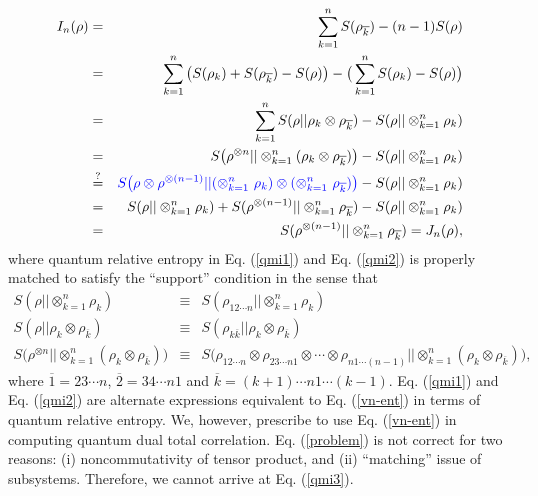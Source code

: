 \documentclass[aps,onecolumn,qic,superscriptaddress,11pt]{revtex4-1}
\begin{document}
\begin{eqnarray}
I_n(\rho) &=& \sum^n_{k=1} S(\rho_{\overline{k}}) - (n-1) S(\rho) \nonumber \\
&=& \sum^n_{k=1} \big(S(\rho_{k}) + S(\rho_{\overline{k}}) - S(\rho) \big) - \big(\sum^n_{k=1} S(\rho_{k}) - S(\rho) \big) \nonumber \\
&=& \sum^n_{k=1} S(\rho || \rho_k \otimes \rho_{\overline{k}}) - S(\rho || \otimes^n_{k=1} \rho_{k}) \label{qmi1} \\
&=& S \big(\rho^{\otimes n} || \otimes^n_{k=1} (\rho_{k} \otimes \rho_{\overline{k}}) \big) - S(\rho || \otimes^n_{k=1} \rho_{k}) \label{qmi2} \\
&\overset{?}{=}& {\color{blue}S \big(\rho \otimes \rho^{\otimes (n-1)} || (\otimes^n_{k=1}~ \rho_{k}) \otimes (\otimes^n_{k=1}~ \rho_{\overline{k}}) \big)} - S(\rho || \otimes^n_{k=1} \rho_{k}) \label{problem} \\
&=& S(\rho || \otimes^n_{k=1} \rho_{k}) + S(\rho^{\otimes (n-1)} || \otimes^n_{k=1} \rho_{\overline{k}}) - S(\rho || \otimes^n_{k=1} \rho_{k}) \nonumber \\
&=& S(\rho^{\otimes (n-1)} || \otimes^n_{k=1} \rho_{\overline{k}}) = J_n(\rho), \label{qmi3}
\end{eqnarray}
where 
quantum relative entropy in Eq. (\ref{qmi1}) and Eq. (\ref{qmi2}) is properly matched to satisfy the ``support'' condition in the sense that 
\begin{eqnarray}
S(\rho || \otimes^n_{k=1} \rho_{k}) &\equiv & S(\rho_{12\cdots n} || \otimes^n_{k=1} \rho_{k}) \nonumber \\
S(\rho || \rho_k \otimes \rho_{\overline{k}}) &\equiv & S(\rho_{k\overline{k}} || \rho_k \otimes \rho_{\overline{k}}) \nonumber \\
S \big(\rho^{\otimes n} || \otimes^n_{k=1} (\rho_{k} \otimes \rho_{\overline{k}}) \big) &\equiv & S \big(\rho_{12\cdots n} \otimes \rho_{23\cdots n1} \otimes \cdots \otimes \rho_{n1\cdots (n-1)} || \otimes^n_{k=1} (\rho_{k} \otimes \rho_{\overline{k}}) \big), \nonumber
\end{eqnarray}
where $\overline{1} = 23 \cdots n$, $\overline{2} = 34 \cdots n1$ and $\overline{k} = (k+1) \cdots n1 \cdots (k-1)$. Eq. (\ref{qmi1}) and Eq. (\ref{qmi2}) are alternate expressions equivalent to Eq. (\ref{vn-ent}) in terms of quantum relative entropy. We, however, prescribe to use Eq. (\ref{vn-ent}) in computing quantum dual total correlation.
Eq. (\ref{problem}) is not correct for two reasons: (i) noncommutativity of tensor product, and (ii) ``matching'' issue of subsystems. Therefore,  we cannot arrive at Eq. (\ref{qmi3}). 
\end{document}
